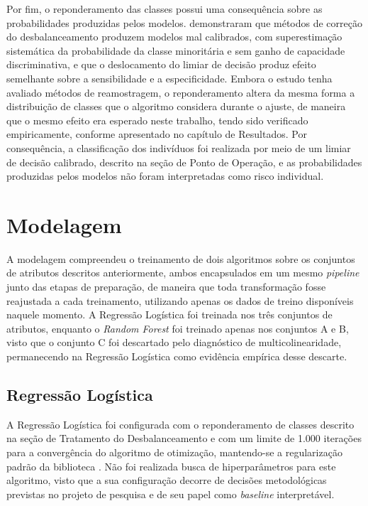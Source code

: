 Por fim, o reponderamento das classes possui uma consequência sobre as probabilidades produzidas pelos modelos. \textcite{vandengoorbergh2022harm} demonstraram que métodos de correção do desbalanceamento produzem modelos mal calibrados, com superestimação sistemática da probabilidade da classe minoritária e sem ganho de capacidade discriminativa, e que o deslocamento do limiar de decisão produz efeito semelhante sobre a sensibilidade e a especificidade. Embora o estudo tenha avaliado métodos de reamostragem, o reponderamento altera da mesma forma a distribuição de classes que o algoritmo considera durante o ajuste, de maneira que o mesmo efeito era esperado neste trabalho, tendo sido verificado empiricamente, conforme apresentado no capítulo de Resultados. Por consequência, a classificação dos indivíduos foi realizada por meio de um limiar de decisão calibrado, descrito na seção de Ponto de Operação, e as probabilidades produzidas pelos modelos não foram interpretadas como risco individual.

\section{Modelagem}\label{sec:modelagem}

A modelagem compreendeu o treinamento de dois algoritmos sobre os conjuntos de atributos descritos anteriormente, ambos encapsulados em um mesmo \textit{pipeline} junto das etapas de preparação, de maneira que toda transformação fosse reajustada a cada treinamento, utilizando apenas os dados de treino disponíveis naquele momento. A Regressão Logística foi treinada nos três conjuntos de atributos, enquanto o \textit{Random Forest} foi treinado apenas nos conjuntos A e B, visto que o conjunto C foi descartado pelo diagnóstico de multicolinearidade, permanecendo na Regressão Logística como evidência empírica desse descarte.

\subsection{Regressão Logística}\label{sec:logistica}
A Regressão Logística foi configurada com o reponderamento de classes descrito na seção de Tratamento do Desbalanceamento e com um limite de 1.000 iterações para a convergência do algoritmo de otimização, mantendo-se a regularização padrão da biblioteca \cite{pedregosa2011scikit}. Não foi realizada busca de hiperparâmetros para este algoritmo, visto que a sua configuração decorre de decisões metodológicas previstas no projeto de pesquisa e de seu papel como \textit{baseline} interpretável.


